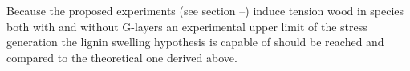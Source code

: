 Because the proposed experiments (see section --) induce tension wood in species
both with and without G-layers an experimental upper limit of the stress
generation the lignin swelling hypothesis is capable of should be reached and
compared to the theoretical one derived above.